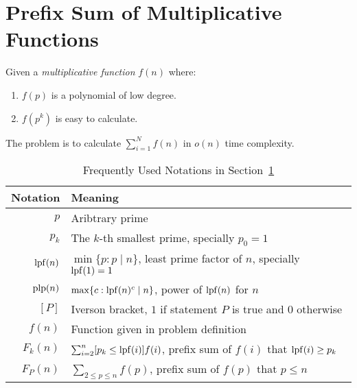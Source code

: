 \section{Prefix Sum of Multiplicative Functions}
\label{tag:prefix-sum-of-multiplicative-functions}

\newcommand{\idiv}[2]{{\lfloor{#1}/{#2}\rfloor}}
\newcommand{\lpf}{\mathop{\rm lpf}}
\newcommand{\pow}{\mathop{\rm plp}}

Given a {\em multiplicative function} $f(n)$ where:
\begin{enumerate}
  \item $f(p)$ is a polynomial of low degree.
  \item $f(p^k)$ is easy to calculate.
\end{enumerate}

The problem is to calculate $\sum_{i=1}^N f(n)$ in $o(n)$ time complexity.

\begin{table}[htbp]
  \caption{Frequently Used Notations in Section~\ref{tag:prefix-sum-of-multiplicative-functions}}
  \centering
  \begin{tabular}{rl}
    \hline
    {\bf Notation} & {\bf Meaning}                                                                    \\
    \hline
    $p$            & Aribtrary prime                                                                  \\
    $p_k$          & The $k$-th smallest prime, specially $p_0=1$                                     \\
    $\lpf(n)$      & $\min\{p : p\mid n\}$, least prime factor of $n$, specially $\lpf(1)=1$          \\
    $\pow(n)$      & $\max\{c : \lpf(n)^c\mid n\}$, power of $\lpf(n)$ for $n$                        \\
    $[P]$          & Iverson bracket, $1$ if statement $P$ is true and $0$ otherwise                  \\
    \hline
    $f(n)$         & Function given in problem definition                                             \\
    $F_k(n)$       & $\sum_{i=2}^n[p_k\le \lpf(i)] f(i)$,  prefix sum of $f(i)$ that $\lpf(i)\ge p_k$ \\
    $F_P(n)$       & $\sum_{2\le p\le n} f(p)$,  prefix sum of $f(p)$ that $p\le n$                   \\
    \hline
  \end{tabular}
\end{table}

